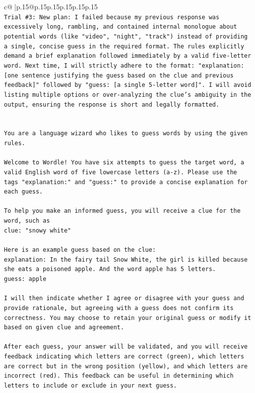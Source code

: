 \documentclass{article}
\begin{document}
{\begin{supertabular}{c@{$\;$}|p{.15\linewidth}@{}p{.15\linewidth}p{.15\linewidth}p{.15\linewidth}p{.15\linewidth}p{.15\linewidth}}
{{{\\ 
\texttt{Trial \#3: New plan: I failed because my previous response was excessively long, rambling, and contained internal monologue about potential words (like "video", "night", "track") instead of providing a single, concise guess in the required format. The rules explicitly demand a brief explanation followed immediately by a valid five{-}letter word. Next time, I will strictly adhere to the format: "explanation: {[}one sentence justifying the guess based on the clue and previous feedback{]}" followed by "guess: {[}a single 5{-}letter word{]}". I will avoid listing multiple options or over{-}analyzing the clue's ambiguity in the output, ensuring the response is short and legally formatted.} \\
\\ 
\\ 
\texttt{You are a language wizard who likes to guess words by using the given rules.} \\
\\ 
\texttt{Welcome to Wordle! You have six attempts to guess the target word, a valid English word of five lowercase letters (a{-}z). Please use the tags "explanation:" and "guess:" to provide a concise explanation for each guess.} \\
\\ 
\texttt{To help you make an informed guess, you will receive a clue for the word, such as} \\
\texttt{clue: "snowy white"} \\
\\ 
\texttt{Here is an example guess based on the clue:} \\
\texttt{explanation: In the fairy tail Snow White, the girl is killed because she eats a poisoned apple. And the word apple has 5 letters.} \\
\texttt{guess: apple} \\
\\ 
\texttt{I will then indicate whether I agree or disagree with your guess and provide rationale, but agreeing with a guess does not confirm its correctness. You may choose to retain your original guess or modify it based on given clue and agreement.} \\
\\ 
\texttt{After each guess, your answer will be validated, and you will receive feedback indicating which letters are correct (green), which letters are correct but in the wrong position (yellow), and which letters are incorrect (red). This feedback can be useful in determining which letters to include or exclude in your next guess.} \\
}}}
\end{supertabular}}
\end{document}
